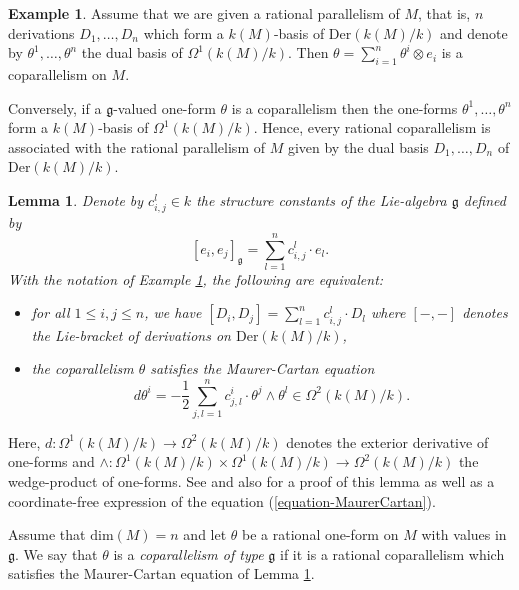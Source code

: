 \documentclass[12pt]{amsart}
\theoremstyle{definition}
\newtheorem{exam}[defn]{Example}
\theoremstyle{plain}
\newtheorem{lem}[defn]{Lemma}
\theoremstyle{exampstyle}\newtheorem{thmx}{Theorem}
\theoremstyle{exampstyle}\newtheorem{thmxbis}{Theorem}
\begin{document}
\begin{exam} \label{example-coparallelism}
Assume that we are given a rational parallelism of $M$, that is, $n$ derivations $D_1,\ldots, D_n$ which form a $k(M)$-basis of $\mathrm{Der}(k(M)/k)$ and denote by $\theta^1,\ldots, \theta^n$ the dual basis  of $\Omega^1(k(M)/k)$. Then 
$\theta = \sum_{i = 1}^n \theta^i \otimes e_i$ 
is a coparallelism on $M$.

Conversely, if a $\mathfrak{g}$-valued one-form $\theta$ is a coparallelism then the one-forms $\theta^1,\ldots, \theta^n$ form a $k(M)$-basis of $\Omega^1(k(M)/k)$. Hence, every rational coparallelism is associated with the rational parallelism of $M$ given by the dual basis $D_1,\ldots, D_n$ of $\mathrm{Der}(k(M)/k)$. 
\end{exam}


\begin{lem} \label{lemma-MaurerCartan-prem}
Denote by $c_{i,j}^l \in k$ the structure constants of the Lie-algebra $\mathfrak{g}$ defined by
$$ [e_i,e_j]_\mathfrak{g} = \sum_{l = 1 }^n c_{i,j}^l \cdot e_l.$$
With the notation of Example \ref{example-coparallelism}, the following are equivalent:
\begin{itemize} 
\item[(i)] for all $1 \leq i,j \leq n$, we have $ [D_i,D_j] = \sum_{l = 1 }^n c_{i,j}^l \cdot D_l$ where $[-,-]$ denotes the Lie-bracket of derivations on $\mathrm{Der}(k(M)/k)$,
\item[(ii)] the coparallelism $\theta$ satisfies the Maurer-Cartan equation
\begin{equation}\label{equation-MaurerCartan} 
d\theta^i = - \frac 1 2 \sum_{j,l = 1}^n c_{j,l}^i \cdot \theta^j \wedge \theta^l \in \Omega^2(k(M)/k).
\end{equation}
\end{itemize}
\end{lem} 

Here, $d: \Omega^1(k(M)/k) \rightarrow \Omega^2(k(M)/k)$ denotes the exterior derivative of one-forms and $\wedge: \Omega^1(k(M)/k) \times \Omega^1(k(M)/k) \rightarrow \Omega^2(k(M)/k)$ the wedge-product of one-forms. See \cite[Section 1]{Blazquez-Casale} and  also \cite[Chapter 3, section 3]{Sharpe} for a proof of this lemma as well as a coordinate-free expression of the equation (\ref{equation-MaurerCartan}).

{ Assume that $\mathrm{dim}(M) = n$ and let $\theta$ be a rational one-form on $M$ with values in $\mathfrak{g}$. We say that $\theta$ is a {\em coparallelism of type} $\mathfrak{g}$ if it is a rational coparallelism which satisfies the Maurer-Cartan equation} of Lemma \ref{lemma-MaurerCartan-prem}.
\end{document}
